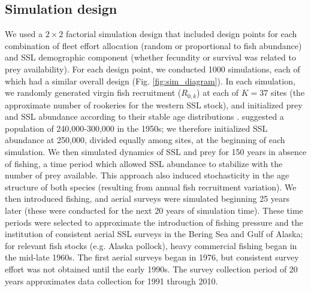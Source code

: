 \documentclass[11pt]{article}
\begin{document}
\subsection{Simulation design}

We used a $2 \times 2$ factorial simulation design that included design points for each combination of fleet effort allocation (random or proportional to fish abundance) and SSL demographic component (whether fecundity or survival was related to prey availability).  For each design point, we conducted 1000 simulations, each of which had a similar overall design (Fig. \ref{fig:sim_diagram}).
In each simulation, we randomly generated virgin fish recruitment ($R_{0,k}$) at each of $K=37$ sites (the approximate number of rookeries for the western SSL stock), and initialized prey and SSL abundance according to their stable age distributions \citep[cf.][]{Caswell2001}.  \citet{LoughlinEtAl1992} suggested a population of 240,000-300,000 in the 1950s; we therefore initialized SSL abundance at 250,000, divided equally among sites, at the beginning of each simulation.  We then simulated dynamics of SSL and prey for 150 years in absence of fishing, a time period which allowed SSL abundance to stabilize with the number of prey available.  This approach also induced stochasticity in the age structure of both species (resulting from annual fish recruitment variation).  We then introduced fishing, and aerial surveys were simulated beginning 25 years later (these were conducted for the next 20 years of simulation time).  These time periods were selected to approximate the introduction of fishing pressure and the institution of consistent aerial SSL surveys in the Bering Sea and Gulf of Alaska; for relevant fish stocks (e.g. Alaska pollock), heavy commercial fishing began in the mid-late 1960s. The first aerial surveys began in 1976, but consistent survey effort was not obtained until the early 1990s.  The survey collection period of 20 years approximates data collection for 1991 through 2010.
\end{document}
